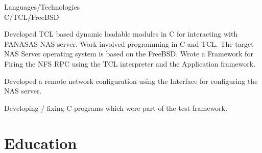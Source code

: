 \documentclass[a4,11pt]{cv4tw}
\begin{document}
{Languages/Technologies \\ C/TCL/FreeBSD}
	{ 
	\begin{missions}		
		\item Developed TCL based dynamic loadable modules in C for interacting with PANASAS NAS server. Work involved programming in C and TCL. The target NAS Server operating system is based on the FreeBSD. Wrote a Framework for Firing the NFS RPC using the TCL interpreter and the Application framework.
		\item Developed a remote network configuration using the  Interface for configuring the NAS server.
		\item Developing / fixing C programs which were part of the test framework.
	\end{missions}	
}	


\section{Education}

\end{document}
